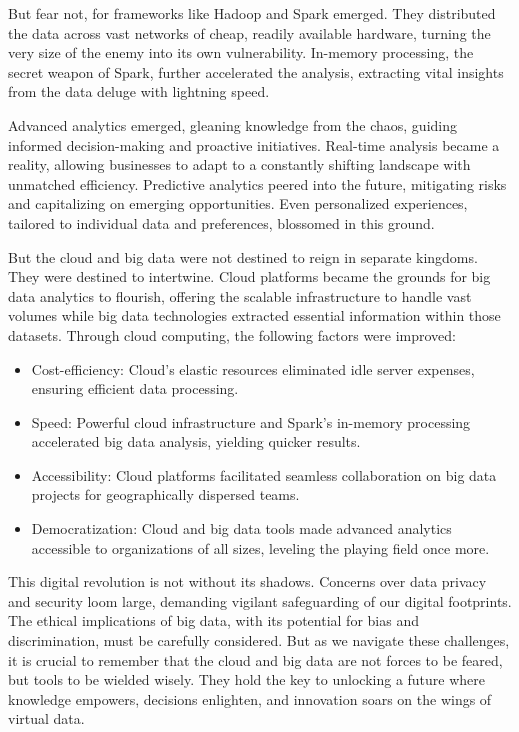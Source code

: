 \documentclass[
  letterpaper,
  DIV=11,
  numbers=noendperiod]{scrreprt}
\providecommand{\tightlist}{%
  \setlength{\itemsep}{0pt}\setlength{\parskip}{0pt}}\usepackage{longtable,booktabs,array}
\begin{document}
But fear not, for frameworks like Hadoop and Spark emerged. They
distributed the data across vast networks of cheap, readily available
hardware, turning the very size of the enemy into its own vulnerability.
In-memory processing, the secret weapon of Spark, further accelerated
the analysis, extracting vital insights from the data deluge with
lightning speed.

Advanced analytics emerged, gleaning knowledge from the chaos, guiding
informed decision-making and proactive initiatives. Real-time analysis
became a reality, allowing businesses to adapt to a constantly shifting
landscape with unmatched efficiency. Predictive analytics peered into
the future, mitigating risks and capitalizing on emerging opportunities.
Even personalized experiences, tailored to individual data and
preferences, blossomed in this ground.

But the cloud and big data were not destined to reign in separate
kingdoms. They were destined to intertwine. Cloud platforms became the
grounds for big data analytics to flourish, offering the scalable
infrastructure to handle vast volumes while big data technologies
extracted essential information within those datasets. Through cloud
computing, the following factors were improved:

\begin{itemize}
\tightlist
\item
  Cost-efficiency: Cloud's elastic resources eliminated idle server
  expenses, ensuring efficient data processing.
\item
  Speed: Powerful cloud infrastructure and Spark's in-memory processing
  accelerated big data analysis, yielding quicker results.
\item
  Accessibility: Cloud platforms facilitated seamless collaboration on
  big data projects for geographically dispersed teams.
\item
  Democratization: Cloud and big data tools made advanced analytics
  accessible to organizations of all sizes, leveling the playing field
  once more.
\end{itemize}

This digital revolution is not without its shadows. Concerns over data
privacy and security loom large, demanding vigilant safeguarding of our
digital footprints. The ethical implications of big data, with its
potential for bias and discrimination, must be carefully considered. But
as we navigate these challenges, it is crucial to remember that the
cloud and big data are not forces to be feared, but tools to be wielded
wisely. They hold the key to unlocking a future where knowledge
empowers, decisions enlighten, and innovation soars on the wings of
virtual data.
\end{document}
